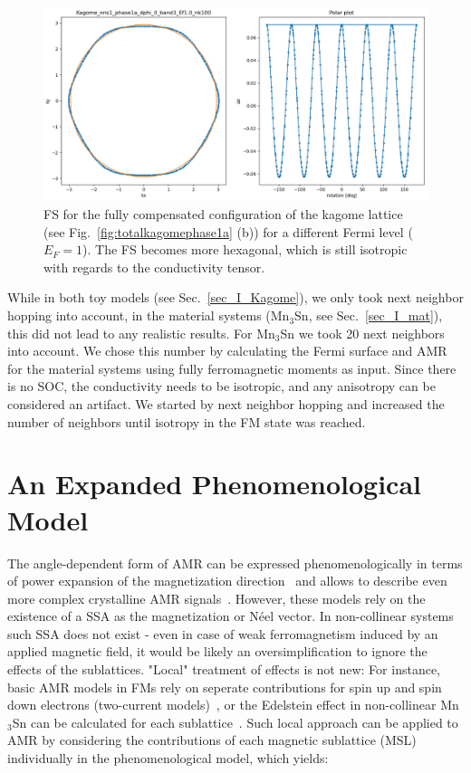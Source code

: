 \documentclass[prb,showpacs,amsmath,amssymb,superscriptaddress,twocolumn,floatfix]{revtex4-1}
\begin{document}
\begin{appendix}
\begin{figure}
	\centering
	\includegraphics[width=\linewidth]{img/Kagome_nns1_phase1a_dphi_0_band3_Ef1.0_nk100}
	\caption{FS for the fully compensated configuration of the kagome lattice (see Fig.~\ref{fig:totalkagomephase1a} (b)) for a different Fermi level ($E_F = 1$). The FS becomes more hexagonal, which is still isotropic with regards to the conductivity tensor.}
	\label{fig:kagomenns1phase1adphi0band3ef1}
\end{figure}



While in both toy models (see Sec.~\ref{sec_I_Kagome}), we only took next neighbor hopping into account, in the material systems (Mn$_3$Sn, see Sec.~\ref{sec_I_mat}), this did not lead to any realistic results. For Mn$_3$Sn we took 20 next neighbors into account. We chose this number by calculating the Fermi surface and AMR for the material systems using fully ferromagnetic moments as input. Since there is no SOC, the conductivity needs to be isotropic, and any anisotropy can be considered an artifact. We started by next neighbor hopping and increased the number of neighbors until isotropy in the FM state was reached.

\section{An Expanded Phenomenological Model}
\label{apx_phenomodel}

The angle-dependent form of AMR can be expressed phenomenologically in terms of power expansion of the magnetization direction~\cite{Doring:1938,Limmer:2008,DeRanieri:2008} and allows to describe even more complex crystalline AMR signals~\cite{Ritzinger:2021, Gonzalez-Betancourt:2024, NamHai:2012}. However, these models rely on the existence of a SSA as the magnetization or N\'eel vector. In non-collinear systems such SSA does not exist - even in case of weak ferromagnetism induced by an applied magnetic field, it would be likely an oversimplification to ignore the effects of the sublattices. "Local" treatment of effects is not new: For instance, basic AMR models in FMs rely on seperate contributions for spin up and spin down electrons (two-current models)~\cite{Ritzinger:2023}, or the Edelstein effect in non-collinear Mn$_3$Sn can be calculated for each sublattice~\cite{Gonzalez-Hernandez:2024}. Such local approach can be applied to AMR by considering the contributions of each magnetic sublattice (MSL) individually in the phenomenological model, which yields:


\end{appendix}
\end{document}
